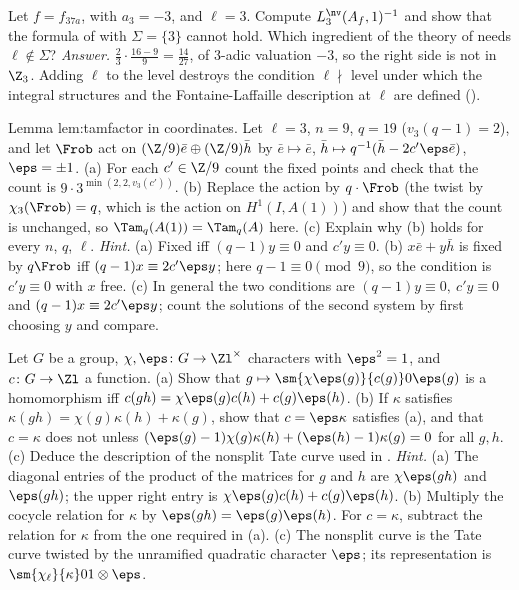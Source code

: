 \begin{sloppypar}
\begin{exercise}\label{ex:paper:dfg14-ell}
Let $f=f_{37a}$, with $a_3=-3$, and $\ell=3$. Compute $L^{\nv}_3(A_f,1)^{-1}$ and show that the formula of  with $\Sigma=\{3\}$ cannot hold. Which ingredient of the theory of
\cite{DFG04} needs $\ell\notin\Sigma$?
\emph{Answer.} $\frac23\cdot\frac{16-9}9=\frac{14}{27}$, of $3$-adic valuation $-3$, so the right side is not in $\Z_3$. Adding $\ell$ to the level destroys the condition $\ell\nmid$ level under which the integral
structures and the Fontaine-Laffaille description at $\ell$ are defined ().
\end{exercise}

\begin{exercise}\label{ex:paper:tamfactor-coordinates}
Lemma lem:tamfactor in coordinates. Let $\ell=3$, $n=9$, $q=19$ ($v_3(q-1)=2$), and let $\Frob$ act on $(\Z/9)\bar e\oplus(\Z/9)\bar h$ by $\bar e\mapsto\bar e$, $\bar h\mapsto q^{-1}(\bar h-2c'\eps\bar e)$, $\eps=\pm1$. (a) For
each $c'\in\Z/9$ count the fixed points and check that the count is $9\cdot3^{\min(2,2,v_3(c'))}$. (b) Replace the action by $q\cdot\Frob$ (the twist by $\chi_3(\Frob)=q$, which is the action on $H^1(I,A(1))$)
and show that the count is unchanged, so $\Tam_q(A(1))=\Tam_q(A)$ here. (c) Explain why (b) holds for every $n$, $q$, $\ell$.
\emph{Hint.} (a) Fixed iff $(q-1)y\equiv0$ and $c'y\equiv0$. (b) $x\bar e+y\bar h$ is fixed by $q\Frob$ iff $(q-1)x\equiv2c'\eps y$; here $q-1\equiv0\pmod9$, so the condition is $c'y\equiv0$ with $x$ free. (c)
In general the two conditions are $(q-1)y\equiv0,\ c'y\equiv0$ and $(q-1)x\equiv2c'\eps y$; count the solutions of the second system by first choosing $y$ and compare.
\end{exercise}

\begin{exercise}\label{ex:paper:corner}
Let $G$ be a group, $\chi,\eps\colon G\to\Zl^\times$ characters with $\eps^2=1$, and $c\colon G\to\Zl$ a function. (a) Show that $g\mapsto\sm{\chi\eps(g)}{c(g)}0{\eps(g)}$ is a homomorphism iff
$c(gh)=\chi\eps(g)c(h)+c(g)\eps(h)$. (b) If $\kappa$ satisfies $\kappa(gh)=\chi(g)\kappa(h)+\kappa(g)$, show that $c=\eps\kappa$ satisfies (a), and that $c=\kappa$ does not unless $(\eps(g)-1)\chi(g)\kappa(h)+(\eps(h)-1)\kappa(g)=0$
for all $g,h$. (c) Deduce the description of the nonsplit Tate curve used in .
\emph{Hint.} (a) The diagonal entries of the product of the matrices for $g$ and $h$ are $\chi\eps(gh)$ and $\eps(gh)$; the upper right entry is $\chi\eps(g)c(h)+c(g)\eps(h)$. (b) Multiply the
cocycle relation for $\kappa$ by $\eps(gh)=\eps(g)\eps(h)$. For $c=\kappa$, subtract the relation for $\kappa$ from the one required in (a). (c) The nonsplit curve is the Tate curve twisted by the
unramified quadratic character $\eps$; its representation is $\sm{\chi_\ell}{\kappa}01\otimes\eps$.
\end{exercise}


\end{sloppypar}

